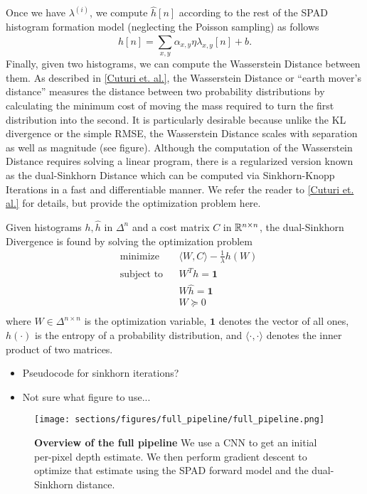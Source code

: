 Once we have $\lambda^{(i)}$, we compute $\hat h[n]$ according to the rest of
the SPAD histogram formation model (neglecting the Poisson sampling) as follows
\begin{equation}
  \hat h[n] = \sum_{x,y}\alpha_{x,y}\eta \lambda_{x,y}[n] + b. \label{diff_forward}
\end{equation}
Finally, given two histograms, we can compute the Wasserstein Distance between
them. As described in \ref{Cuturi et. al.}, the Wasserstein Distance or ``earth
mover's distance'' measures the distance between two probability distributions
by calculating the minimum cost of moving the mass required to turn the first
distribution into the second. It is particularly desirable
because unlike the KL divergence or the simple RMSE, the Wasserstein Distance scales with
separation as well as magnitude (see figure). Although the computation of the
Wasserstein Distance requires solving a linear program, there is a regularized
version known as the dual-Sinkhorn Distance
which can be computed via Sinkhorn-Knopp Iterations in a fast and differentiable manner.
We refer the reader to \ref{Cuturi et. al.} for details, but provide the
optimization problem here.

Given histograms $h, \hat h$ in $\Delta^n$ and a cost matrix $C$ in $\mathbb{R}^{n \times
  n}$, the dual-Sinkhorn Divergence is found by solving
the optimization problem
\begin{equation}
    \begin{aligned}
    &\text{minimize} && \langle W, C \rangle  - \frac{1}{\lambda}h(W) \\
    &\text{subject to} && W^Th = \bm{1} \\
    &                  && W\hat h = \bm{1} \\
    &                  && W \succeq 0 \\
  \end{aligned}
\end{equation}
where $W \in \Delta^{n \times n}$ is the optimization variable, $\bm{1}$ denotes the
vector of all ones, $h(\cdot)$ is the entropy of a probability distribution, and
$\langle \cdot, \cdot \rangle$ denotes the inner product of two matrices.
\begin{itemize}
\item Pseudocode for sinkhorn iterations?
  \item Not sure what figure to use...
\end{itemize}
\newpage
\begin{figure}
  \texttt{[image: sections/figures/full\_pipeline/full\_pipeline.png]}
  \caption{\textbf{Overview of the full pipeline} We use a CNN to get an initial
  per-pixel depth estimate. We then perform gradient descent to optimize that
  estimate using the SPAD forward model and the dual-Sinkhorn distance.}
\end{figure}


